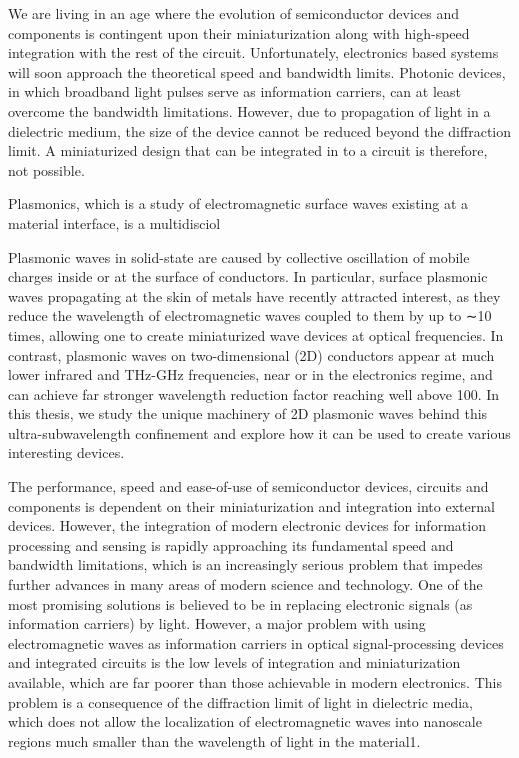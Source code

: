 We are living in an age where the evolution of semiconductor devices and components is contingent upon their miniaturization along with high-speed integration with the rest of the circuit. Unfortunately, electronics based systems will soon approach the theoretical speed and bandwidth limits. Photonic devices, in which broadband light pulses serve as information carriers, can at least overcome the bandwidth limitations. However, due to propagation of light in a dielectric medium, the size of the device cannot be reduced beyond the diffraction limit. A miniaturized design that can be integrated in to a circuit is therefore, not possible.





Plasmonics, which is a study of electromagnetic surface waves existing at a material interface, is a multidisciol


Plasmonic waves in solid-state are caused by collective oscillation of mobile charges inside or at the
surface of conductors. In particular, surface plasmonic waves propagating at the skin of metals have
recently attracted interest, as they reduce the wavelength of electromagnetic waves coupled to them by
up to ∼10 times, allowing one to create miniaturized wave devices at optical frequencies. In contrast,
plasmonic waves on two-dimensional (2D) conductors appear at much lower infrared and THz-GHz
frequencies, near or in the electronics regime, and can achieve far stronger wavelength reduction factor
reaching well above 100. In this thesis, we study the unique machinery of 2D plasmonic waves behind
this ultra-subwavelength confinement and explore how it can be used to create various interesting devices.

The performance, speed and ease-of-use of semiconductor devices, circuits and components is dependent on their miniaturization and integration into external devices. However, the integration of modern electronic devices for information processing and sensing is rapidly approaching its fundamental speed and bandwidth limitations, which is an increasingly serious problem that impedes further advances in many areas of modern science and technology. One of the most promising solutions is believed to be in replacing electronic signals (as information carriers) by light. However, a major problem with using electromagnetic waves as information carriers in optical signal-processing devices and integrated circuits is the low levels of integration and miniaturization available, which are far poorer than those achievable in modern electronics. This problem is a consequence of the diffraction limit of light in dielectric media, which does not allow the localization of electromagnetic waves into nanoscale regions much smaller than the wavelength of light in the material1.

